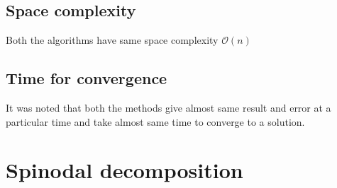 \documentclass[11pt]{article}
\begin{document}
\subsection*{Space complexity}
Both the algorithms have same space complexity  $\mathcal{O}(n)$
\subsection*{Time for convergence}
It was noted that both the methods give almost same result and error at a particular time and take almost same time to converge to a solution. 




\section{Spinodal decomposition}
\end{document}
